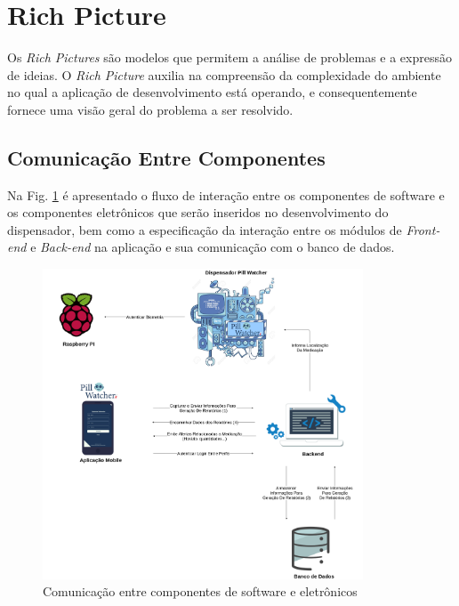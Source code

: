 \section{Rich Picture}
\label{richpiture_software}

Os \textit{Rich Pictures} são modelos que permitem a análise de problemas e a expressão de ideias. O \textit{Rich Picture} auxilia na compreensão da complexidade do ambiente no qual a aplicação de desenvolvimento está operando, e consequentemente fornece uma visão geral do problema a ser resolvido.

\subsection{Comunicação Entre Componentes}
Na Fig. \ref{fig:Communication_between_components} é apresentado o fluxo de interação entre os componentes de software e os componentes eletrônicos que serão inseridos no desenvolvimento do dispensador, bem como a especificação da interação entre os módulos de \textit{Front-end} e \textit{Back-end} na aplicação e sua comunicação com o banco de dados.


\begin{figure}[H]
    \centering
    \includegraphics[width=0.85\textwidth]{figuras/software/rich_picture/comu_entre_componentes.png}
    \caption{Comunicação entre componentes de software e eletrônicos}
    \label{fig:Communication_between_components}
\end{figure}



